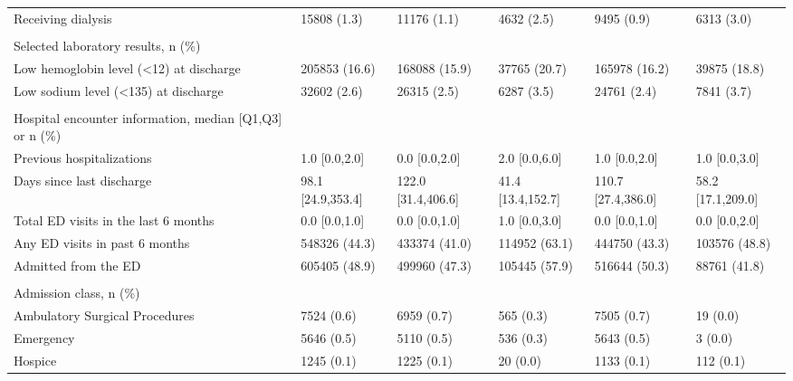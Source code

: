 \begin{adjustbox}{width={\textwidth},totalheight={\textheight},keepaspectratio,frame,padding=0ex 0ex -910ex 0ex}
{\begin{tabular}{L{20em}C{10em}C{10em}C{10em}C{10em}C{10em}}
\hspace{3mm} Receiving dialysis  & 15808 (1.3) & 11176 (1.1) & 4632 (2.5) & 9495 (0.9) & 6313 (3.0)\\
&  &  &  &  &  \\
Selected laboratory results, n (\%) &  &  &  &  &  \\
\hspace{3mm} Low hemoglobin level (<12) at discharge  & 205853 (16.6) & 168088 (15.9) & 37765 (20.7) & 165978 (16.2) & 39875 (18.8)\\
\hspace{3mm} Low sodium level (<135) at discharge  & 32602 (2.6) & 26315 (2.5) & 6287 (3.5) & 24761 (2.4) & 7841 (3.7)\\
  &  &  &  &  &  \\
  Hospital encounter information, median [Q1,Q3] or n (\%) &  &  &  &  &  \\
  \hspace{3mm} Previous hospitalizations   & 1.0 [0.0,2.0] & 0.0 [0.0,2.0] & 2.0 [0.0,6.0] & 1.0 [0.0,2.0] & 1.0 [0.0,3.0]\\
\hspace{3mm} Days since last discharge   & 98.1 [24.9,353.4] & 122.0 [31.4,406.6] & 41.4 [13.4,152.7] & 110.7 [27.4,386.0] & 58.2 [17.1,209.0]\\ 
\hspace{3mm} Total ED visits in the last 6 months   & 0.0 [0.0,1.0] & 0.0 [0.0,1.0] & 1.0 [0.0,3.0] & 0.0 [0.0,1.0] & 0.0 [0.0,2.0]\\
\hspace{3mm} Any ED visits in past 6 months   & 548326 (44.3) & 433374 (41.0) & 114952 (63.1) & 444750 (43.3) & 103576 (48.8)\\
\hspace{3mm} Admitted from the ED  & 605405 (48.9) & 499960 (47.3) & 105445 (57.9) & 516644 (50.3) & 88761 (41.8)\\
&  &  &  &  &  \\
Admission class, n (\%) & &    &     &        &         \\
\hspace{3mm} Ambulatory Surgical Procedures & 7524 (0.6) & 6959 (0.7) & 565 (0.3) & 7505 (0.7) & 19 (0.0)\\
 \hspace{3mm} Emergency & 5646 (0.5) & 5110 (0.5) & 536 (0.3) & 5643 (0.5) & 3 (0.0)\\
  \hspace{3mm} Hospice & 1245 (0.1) & 1225 (0.1) & 20 (0.0) & 1133 (0.1) & 112 (0.1)\\

\end{tabular}}
\end{adjustbox}
